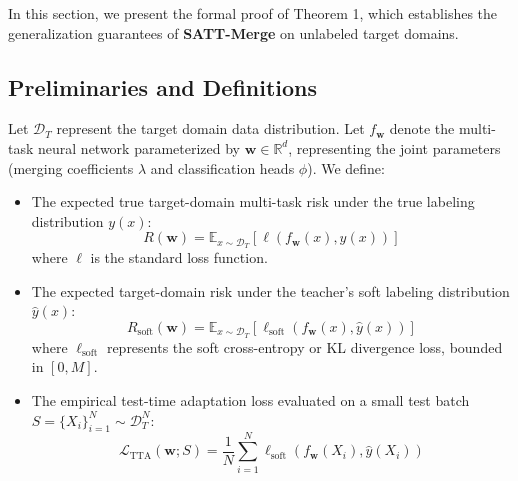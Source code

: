 \documentclass{article}
\begin{document}
In this section, we present the formal proof of Theorem 1, which establishes the generalization guarantees of \textbf{SATT-Merge} on unlabeled target domains.

\subsection{Preliminaries and Definitions}
Let $\mathcal{D}_T$ represent the target domain data distribution. Let $f_{\mathbf{w}}$ denote the multi-task neural network parameterized by $\mathbf{w} \in \mathbb{R}^d$, representing the joint parameters (merging coefficients $\lambda$ and classification heads $\phi$). 
We define:
\begin{itemize}
    \item The expected true target-domain multi-task risk under the true labeling distribution $y(x)$:
    \begin{equation}
        R(\mathbf{w}) = \mathbb{E}_{x \sim \mathcal{D}_T} [ \ell(f_{\mathbf{w}}(x), y(x)) ]
    \end{equation}
    where $\ell$ is the standard loss function.
    \item The expected target-domain risk under the teacher's soft labeling distribution $\hat{y}(x)$:
    \begin{equation}
        R_{\text{soft}}(\mathbf{w}) = \mathbb{E}_{x \sim \mathcal{D}_T} [ \ell_{\text{soft}}(f_{\mathbf{w}}(x), \hat{y}(x)) ]
    \end{equation}
    where $\ell_{\text{soft}}$ represents the soft cross-entropy or KL divergence loss, bounded in $[0, M]$.
    \item The empirical test-time adaptation loss evaluated on a small test batch $S = \{X_i\}_{i=1}^N \sim \mathcal{D}_T^N$:
    \begin{equation}
        \mathcal{L}_{\text{TTA}}(\mathbf{w}; S) = \frac{1}{N} \sum_{i=1}^N \ell_{\text{soft}}(f_{\mathbf{w}}(X_i), \hat{y}(X_i))
    \end{equation}
\end{itemize}
\end{document}
